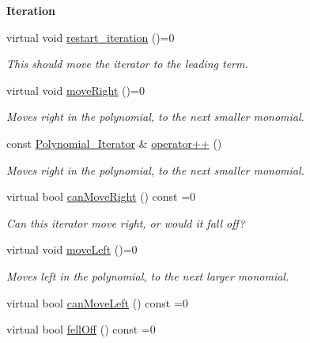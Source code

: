 \begin{Indent}\textbf{ Iteration}\par
\begin{DoxyCompactItemize}
\item 
\mbox{\label{group___iterator_group_a7135fd6c3a90134741abc2da51467a43}} 
virtual void \hyperlink{group___iterator_group_a7135fd6c3a90134741abc2da51467a43}{restart\+\_\+iteration} ()=0
\begin{DoxyCompactList}\small\item\em This should move the iterator to the leading term. \end{DoxyCompactList}\item 
\mbox{\label{group___iterator_group_ad7adb26df3077c6c7dec39e066436ce9}} 
virtual void \hyperlink{group___iterator_group_ad7adb26df3077c6c7dec39e066436ce9}{move\+Right} ()=0
\begin{DoxyCompactList}\small\item\em Moves right in the polynomial, to the next smaller monomial. \end{DoxyCompactList}\item 
\mbox{\label{group___iterator_group_a934c291b780f91efefea23880827d5dc}} 
const \hyperlink{group___iterator_group_class_polynomial___iterator}{Polynomial\+\_\+\+Iterator} \& \hyperlink{group___iterator_group_a934c291b780f91efefea23880827d5dc}{operator++} ()
\begin{DoxyCompactList}\small\item\em Moves right in the polynomial, to the next smaller monomial. \end{DoxyCompactList}\item 
\mbox{\label{group___iterator_group_ae800f42d78fae005b9d9600b00946026}} 
virtual bool \hyperlink{group___iterator_group_ae800f42d78fae005b9d9600b00946026}{can\+Move\+Right} () const =0
\begin{DoxyCompactList}\small\item\em Can this iterator move right, or would it fall off? \end{DoxyCompactList}\item 
\mbox{\label{group___iterator_group_a47683fc8085c51bd14c5647a7e9e7e87}} 
virtual void \hyperlink{group___iterator_group_a47683fc8085c51bd14c5647a7e9e7e87}{move\+Left} ()=0
\begin{DoxyCompactList}\small\item\em Moves left in the polynomial, to the next larger monomial. \end{DoxyCompactList}\item 
virtual bool \hyperlink{group___iterator_group_a7ab348897446bc182500f84df8a9e590}{can\+Move\+Left} () const =0
\item 
virtual bool \hyperlink{group___iterator_group_ac571e120134088d6067718bbad513e2d}{fell\+Off} () const =0
\end{DoxyCompactItemize}
\end{Indent}
